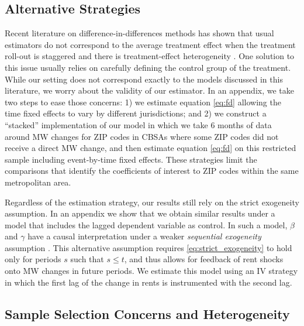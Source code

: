 \subsection{Alternative Strategies}\label{sec:alt_emp_strategies}

Recent literature on difference-in-differences methods has shown that usual
estimators do not correspond to the average treatment effect when the treatment 
roll-out is staggered and there is treatment-effect heterogeneity 
\parencite{deChaisemartinEtAl2022,RothEtAl2022}.
One solution to this issue usually relies on carefully defining the control
group of the treatment.
While our setting does not correspond exactly to the models discussed in this
literature, we worry about the validity of our estimator.
In an appendix, we take two steps to ease those concerns:
1) we estimate equation \eqref{eq:fd} allowing the time fixed effects to vary
by different jurisdictions; and
2) we construct a ``stacked'' implementation of our model in which we take
6 months of data around MW changes for ZIP codes in CBSAs where some ZIP codes 
did not receive a direct MW change, and then estimate equation \eqref{eq:fd} on
this restricted sample including event-by-time fixed effects.
These strategies limit the comparisons that identify the coefficients of 
interest to ZIP codes within the same metropolitan area.

Regardless of the estimation strategy, our results still rely on the 
strict exogeneity assumption.
In an appendix we show that we obtain similar results under a model that 
includes the lagged dependent variable as control.
In such a model, $\beta$ and $\gamma$ have a causal interpretation under a 
weaker \textit{sequential exogeneity} assumption
\parencite{ArellanoBond1991, ArellanoHonore2001}.
This alternative assumption requires \eqref{eq:strict_exogeneity} to hold
only for periods $s$ such that $s \leq t$, and thus allows for feedback of 
rent shocks onto MW changes in future periods.
We estimate this model using an IV strategy in which the first lag of the change
in rents is instrumented with the second lag.


\subsection{Sample Selection Concerns and Heterogeneity}\label{sec:emp_start_heterogeneity}

